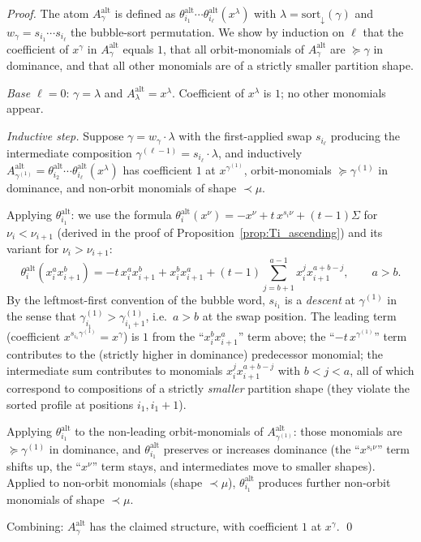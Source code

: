 \documentclass[11pt]{article}
\theoremstyle{definition}
\begin{document}
\begin{proof}
The atom $A^{\mathrm{alt}}_\gamma$ is defined as
$\theta_{i_1}^{\mathrm{alt}} \cdots \theta_{i_\ell}^{\mathrm{alt}}(x^\lambda)$
with $\lambda = \mathrm{sort}_\downarrow(\gamma)$ and $w_\gamma = s_{i_1}\cdots s_{i_\ell}$
the bubble-sort permutation. We show by induction on $\ell$ that the
coefficient of $x^\gamma$ in $A^{\mathrm{alt}}_\gamma$ equals $1$, that all
orbit-monomials of $A^{\mathrm{alt}}_\gamma$ are $\succeq \gamma$ in dominance,
and that all other monomials are of a strictly smaller partition shape.

\emph{Base $\ell = 0$}: $\gamma = \lambda$ and $A^{\mathrm{alt}}_\lambda = x^\lambda$.
Coefficient of $x^\lambda$ is $1$; no other monomials appear.

\emph{Inductive step.} Suppose $\gamma = w_\gamma\cdot\lambda$ with the
first-applied swap $s_{i_\ell}$ producing the intermediate composition
$\gamma^{(\ell-1)} = s_{i_\ell} \cdot \lambda$, and inductively
$A^{\mathrm{alt}}_{\gamma^{(1)}} = \theta_{i_2}^{\mathrm{alt}}\cdots\theta_{i_\ell}^{\mathrm{alt}}(x^\lambda)$
has coefficient $1$ at $x^{\gamma^{(1)}}$, orbit-monomials $\succeq \gamma^{(1)}$
in dominance, and non-orbit monomials of shape $\prec \mu$.

Applying $\theta_{i_1}^{\mathrm{alt}}$: we use the formula
$\theta_i^{\mathrm{alt}}(x^\nu) = -x^\nu + t\,x^{s_i\nu} + (t-1)\Sigma$ for
$\nu_i < \nu_{i+1}$ (derived in the proof of
Proposition~\ref{prop:Ti_ascending}) and its variant for $\nu_i > \nu_{i+1}$:
\[
\theta_i^{\mathrm{alt}}(x_i^a x_{i+1}^b) = -t\,x_i^a x_{i+1}^b + x_i^b x_{i+1}^a
  + (t-1)\!\!\!\sum_{j=b+1}^{a-1}\!\! x_i^j x_{i+1}^{a+b-j},\qquad a > b.
\]
By the leftmost-first convention of the bubble word, $s_{i_1}$ is a
\emph{descent} at $\gamma^{(1)}$ in the sense that
$\gamma^{(1)}_{i_1} > \gamma^{(1)}_{i_1+1}$, i.e.\ $a > b$ at the swap
position. The leading term (coefficient $x^{s_{i_1}\gamma^{(1)}} = x^\gamma$)
is $1$ from the ``$x_i^b x_{i+1}^a$'' term above; the ``$-t\,x^{\gamma^{(1)}}$''
term contributes to the (strictly higher in dominance) predecessor
monomial; the intermediate sum contributes to monomials
$x_i^j x_{i+1}^{a+b-j}$ with $b < j < a$, all of which correspond to
compositions of a strictly \emph{smaller} partition shape (they violate
the sorted profile at positions $i_1, i_1+1$).

Applying $\theta_{i_1}^{\mathrm{alt}}$ to the non-leading orbit-monomials of
$A^{\mathrm{alt}}_{\gamma^{(1)}}$: those monomials are $\succeq \gamma^{(1)}$ in
dominance, and $\theta_{i_1}^{\mathrm{alt}}$ preserves or increases dominance
(the ``$x^{s_i\nu}$'' term shifts up, the ``$x^\nu$'' term stays, and
intermediates move to smaller shapes). Applied to non-orbit monomials
(shape $\prec \mu$), $\theta_{i_1}^{\mathrm{alt}}$ produces further non-orbit
monomials of shape $\prec \mu$.

Combining: $A^{\mathrm{alt}}_\gamma$ has the claimed structure, with coefficient
$1$ at $x^\gamma$. \qed
\end{proof}
\end{document}
